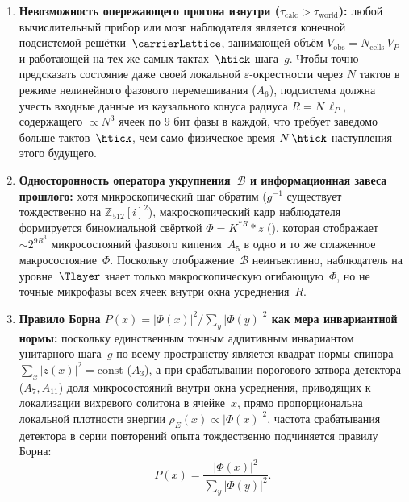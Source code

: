 \begin{proposition}
\label{prop:observer-lock-born}
\begin{enumerate}[leftmargin=*]
\item \textbf{Невозможность опережающего прогона изнутри ($\tau_{\mathrm{calc}} > \tau_{\mathrm{world}}$):}
  любой вычислительный прибор или мозг наблюдателя является конечной подсистемой решётки~$\carrierLattice$, занимающей объём $V_{\mathrm{obs}} = N_{\mathrm{cells}}\,V_P$ и работающей на тех же самых тактах~$\htick$ шага~$g$.
  Чтобы точно предсказать состояние даже своей локальной $\varepsilon$-окрестности через $N$ тактов в режиме нелинейного фазового перемешивания ($A_6$), подсистема должна учесть входные данные из каузального конуса радиуса $R = N\,\ell_P$, содержащего $\propto N^3$ ячеек по $9\text{ бит}$ фазы в каждой, что требует заведомо больше тактов~$\htick$, чем само физическое время $N\,\htick$ наступления этого будущего.
\item \textbf{Односторонность оператора укрупнения~$\mathcal{B}$ и информационная завеса прошлого:}
  хотя микроскопический шаг обратим ($g^{-1}$ существует тождественно на $\mathbb{Z}_{512}[i]^2$), макроскопический кадр наблюдателя формируется биномиальной свёрткой $\Phi = K^{*R} * z$ (), которая отображает $\sim 2^{9 R^3}$ микросостояний фазового кипения~$A_5$ в одно и то же сглаженное макросостояние~$\Phi$.
  Поскольку отображение~$\mathcal{B}$ неинъективно, наблюдатель на уровне~$\Tlayer$ знает только макроскопическую огибающую~$\Phi$, но не точные микрофазы всех ячеек внутри окна усреднения~$R$.
\item \textbf{Правило Борна $P(x) = |\Phi(x)|^2 / \sum_y |\Phi(y)|^2$ как мера инвариантной нормы:}
  поскольку единственным точным аддитивным инвариантом унитарного шага~$g$ по всему пространству является квадрат нормы спинора $\sum_x |z(x)|^2 = \mathrm{const}$ ($A_3$), а при срабатывании порогового затвора детектора ($A_7, A_{11}$) доля микросостояний внутри окна усреднения, приводящих к локализации вихревого солитона в ячейке~$x$, прямо пропорциональна локальной плотности энергии $\rho_E(x) \propto |\Phi(x)|^2$, частота срабатывания детектора в серии повторений опыта тождественно подчиняется правилу Борна:
  \begin{equation}
  \label{eq:observer-born-rule}
    P(x) = \frac{|\Phi(x)|^2}{\sum_{y} |\Phi(y)|^2}.
  \end{equation}
\end{enumerate}
\end{proposition}

